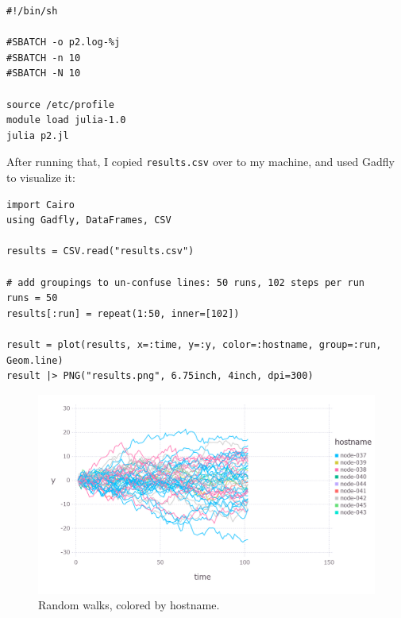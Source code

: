 \documentclass[nobib]{tufte-handout}
\begin{document}

\begin{verbatim}
#!/bin/sh

#SBATCH -o p2.log-%j
#SBATCH -n 10
#SBATCH -N 10

source /etc/profile
module load julia-1.0
julia p2.jl

\end{verbatim}

After running that, I copied \texttt{results.csv} over to my machine, and used Gadfly to visualize it:

\begin{verbatim}
import Cairo
using Gadfly, DataFrames, CSV

results = CSV.read("results.csv")

# add groupings to un-confuse lines: 50 runs, 102 steps per run
runs = 50
results[:run] = repeat(1:50, inner=[102])

result = plot(results, x=:time, y=:y, color=:hostname, group=:run, Geom.line)
result |> PNG("results.png", 6.75inch, 4inch, dpi=300)
\end{verbatim}

\begin{figure}
\centering
\includegraphics[width=.9\linewidth]{./results.png}
\caption[results]{\label{fig:full-width}
Random walks, colored by hostname.}
\end{figure}
\end{document}

